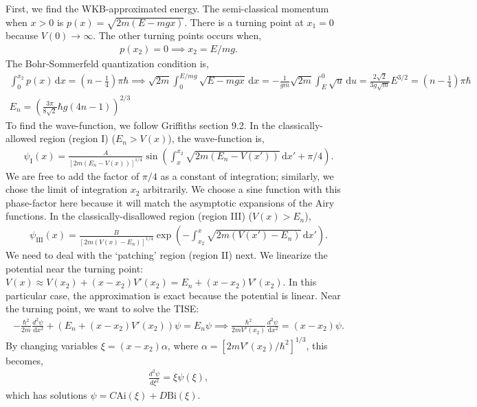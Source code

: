 \documentclass[10pt]{article}
\newcommand{\1}{\mathbf 1}
\begin{document}
First, we find the WKB-approximated energy.
The semi-classical momentum when $x> 0$ is $p(x) = \sqrt{2m(E - mgx)}$.
There is a turning point at $x_1=0$ because $V(0) \to \infty$.
The other turning points occurs when,
\begin{align}
	p(x_2) = 0 \implies 
	x_2 = E/mg.
\end{align}
The Bohr-Sommerfeld quantization condition is,
\begin{gather}
	\int_0^{x_2} p(x) \,\mathrm{d} x
	=
	\left(
		n - \frac{1}{4}
	\right)\pi \hbar
	\implies
	\sqrt{2m}
	\int_0^{E/mg}
	\sqrt{E - m g x}
	\,\mathrm{d} x
	=
	-
	\frac{1}{gm}
	\sqrt{2m}
	\int_{E}^{0}
	\sqrt{u}
	\,\mathrm{d} u
	=
	\frac{2\sqrt{2}}{3g\sqrt{m}} E^{3/2}
	=
	\left(
		n - \frac{1}{4}
	\right) \pi \hbar\nonumber
	\\
	E_n = 
	\left(
		\frac{3\pi}{8\sqrt{2}}  \hbar g
		(4n-1)
	\right)^{2/3}
\end{gather}
To find the wave-function, we follow Griffiths section 9.2.
In the classically-allowed region (region I) ($E_n > V(x)$), the wave-function is,
\begin{align}
	\psi_\mathrm{I}(x) =
	\frac{A}{[2m(E_n - V(x))]^{1/4}}
	\sin(\int_x^{x_2} \sqrt{2m (E_n - V(x'))} \,\mathrm{d} x' + \pi/4).
\end{align}
We are free to add the factor of $\pi/4$ as a constant of integration; similarly, we chose the limit of integration $x_2$ arbitrarily.
We choose a sine function with this phase-factor here because it will match the asymptotic expansions of the Airy functions.
In the classically-disallowed region (region III) ($V(x) > E_n$),
\begin{align}
	\psi_\mathrm{III}(x)
	=
	\frac{B}{[2m(V(x) - E_n)]^{1/4}}
	\exp(-\int_{x_2}^x \sqrt{2m(V(x') - E_n)} \,\mathrm{d} x').
\end{align}
We need to deal with the `patching' region (region II) next.
We linearize the potential near the turning point: $V(x) \approx V(x_2) + (x-x_2) V'(x_2)
=
E_n + (x-x_2) V'(x_2)
$.
In this particular case, the approximation is exact because the potential is linear.
Near the turning point, we want to solve the TISE:
\begin{align}
	-\frac{\hbar^2}{2m}
	\frac{d^2\psi}{\,\mathrm{d} x^2}
	+
	(E_n + (x-x_2)V'(x_2))
	\psi
	=
	E_n \psi
	\implies 
	\frac{\hbar^2}{2m V'(x_2)}
	\frac{d^2\psi}{\,\mathrm{d} x^2}
	=
	(x-x_2)
	\psi.
\end{align}
By changing variables $\xi = (x-x_2)\alpha$, where $\alpha =[ 2mV'(x_2)/\hbar^2]^{1/3}$, this becomes,
\begin{align}
	\frac{d^2 \psi}{d\xi^2} = \xi \psi(\xi),
\end{align}
which has solutions $\psi = C\mathrm{Ai}(\xi) + D \mathrm{Bi}(\xi)$.
\end{document}
